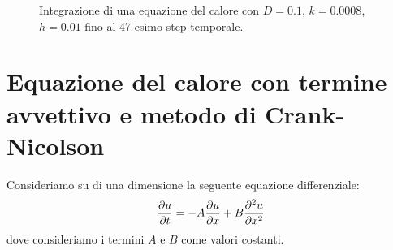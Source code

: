 \documentclass[10pt,a4paper]{article}
\begin{document}
\begin{figure}
	\centering
	\quad
	\caption{Integrazione di una equazione del calore con $D=0.1$, $k=0.0008$, $h=0.01$ fino al 47-esimo step temporale.}
	\label{fig:stabilita}
\end{figure}


\section{Equazione del calore con termine avvettivo e metodo di Crank-Nicolson}

Consideriamo su di una dimensione la seguente equazione differenziale:
\begin{equation}
	\pdv{u}{t} = -A \pdv{u}{x} + B\pdv[2]{u}{x}
\end{equation}
dove consideriamo i termini $A$ e $B$ come valori costanti.
\end{document}
